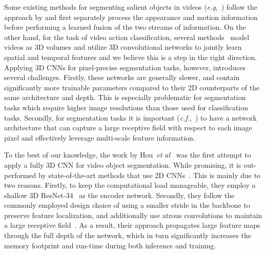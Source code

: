 \documentclass{bmvc2k_arxiv}
\makeatletter
\newcommand*{\eg}{\emph{e.g.}\@\xspace}
\newcommand*{\cf}{\emph{c.f.}\@\xspace}
\newcommand*{\etal}{\emph{et al.}\@\xspace}
\def\eg{\emph{e.g}\bmvaOneDot}
\def\etal{\emph{et al}\bmvaOneDot}
\makeatother
\begin{document}
Some existing methods for segmenting salient objects in videos (\eg,~\cite{Jain17CVPR, Tokmakov17ICCV}) follow the approach by \cite{simonyan14nips} and first separately process the appearance and motion information before performing a learned fusion of the two streams of information.
On the other hand, for the task of video action classification, several methods~\cite{Hara18CVPR, Tran18CVPR, Tran19ICCV, Ghadiyaram19CVPR} model videos as 3D volumes and utilize 3D convolutional networks to jointly learn spatial and temporal features and we believe this is a step in the right direction. 
Applying 3D CNNs for pixel-precise segmentation tasks, however, introduces several challenges. Firstly, these networks are generally slower, and contain significantly more trainable parameters compared to their 2D counterparts of the same architecture and depth.
This is especially problematic for segmentation tasks which require higher image resolutions than those used for classification tasks. Secondly, for segmentation tasks it is important (\cf,~\cite{Chen17ARXIV}) to have a network architecture that can capture a large receptive field with respect to each image pixel and effectively leverage multi-scale feature information.

To the best of our knowledge, the work by Hou~\etal~\cite{Hou19BMVC} was the first attempt to apply a fully 3D CNN for video object segmentation.
While promising, it is out-performed by state-of-the-art methods that use 2D CNNs~\cite{Wang19ICCV, Yang19ICCVAnchorDiff}.
This is mainly due to two reasons. Firstly, to keep the computational load manageable, they employ a shallow 3D ResNet-34~\cite{Tran18CVPR} as the encoder network. 
Secondly, they follow the commonly employed design choice of using a smaller stride in the backbone to preserve feature localization, and additionally use atrous convolutions to maintain a large receptive field~\cite{Chen17ARXIV,Chen2018ECCV}. As a result, their approach propagates large feature maps through the full depth of the network, which in turn significantly increases the memory footprint and run-time during both inference and training. 
\end{document}
